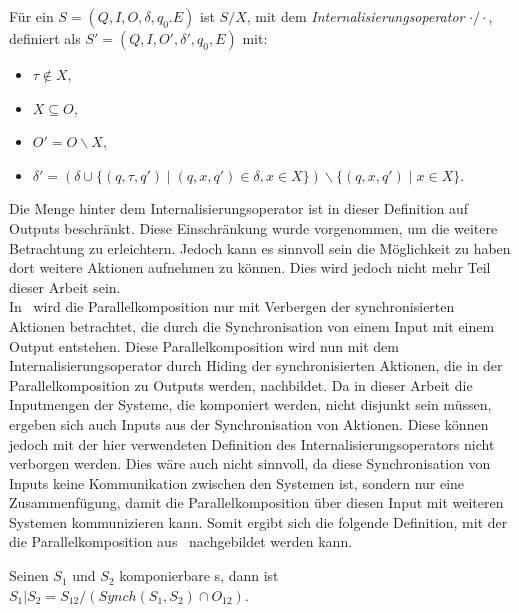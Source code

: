 \begin{Def}[Internalisierungsoperator]
  Für ein \EIO{} $S=(Q,I,O,\delta ,q_0.E)$ ist $S/X$, mit
  dem \emph{Internalisierungsoperator} $\cdot /\cdot$,
  definiert als $S'=(Q,I,O',\delta ', q_0,E)$ mit:
  \begin{itemize}
    \item $\tau \notin X$,
    \item $X\subseteq O$,
    \item $O'=O\backslash X$,
    \item $\delta '=(\delta\cup\{(q,\tau ,q')\mid (q,x,q')\in\delta
      ,x\in X\})\backslash \{(q,x,q')\mid x\in X\}$.
  \end{itemize}
\end{Def}

Die Menge hinter dem Internalisierungsoperator ist in dieser Definition auf
Outputs beschränkt. Diese Einschränkung wurde vorgenommen, um die weitere
Betrachtung zu erleichtern. Jedoch kann es sinnvoll sein die Möglichkeit zu
haben dort weitere Aktionen aufnehmen zu können. Dies wird jedoch nicht mehr
Teil dieser Arbeit sein.\\
In~\cite{Vogler2014EIO} wird die Parallelkomposition nur mit Verbergen der
synchronisierten Aktionen betrachtet, die durch die Synchronisation von einem
Input mit einem Output entstehen. Diese Parallelkomposition wird nun mit dem
Internalisierungsoperator durch Hiding der synchronisierten Aktionen, die in
der Parallelkomposition zu Outputs werden, nachbildet. Da in dieser Arbeit
die Inputmengen der Systeme, die komponiert werden, nicht disjunkt sein müssen,
ergeben sich auch Inputs aus der Synchronisation von Aktionen. Diese können
jedoch mit der hier verwendeten Definition des Internalisierungsoperators nicht verborgen
werden. Dies wäre auch nicht sinnvoll, da diese Synchronisation von Inputs
keine Kommunikation zwischen den Systemen ist, sondern nur eine Zusammenfügung,
damit die Parallelkomposition über diesen Input mit weiteren Systemen
kommunizieren kann. Somit ergibt sich die folgende Definition, mit der die
Parallelkomposition aus~\cite{Vogler2014EIO} nachgebildet werden kann.

\begin{Def}
\label{defIntParal}
  Seinen $S_1$ und $S_2$ komponierbare \EIO{}s, dann ist
  $S_1|S_2=S_{12}/(Synch(S_1,S_2)\cap O_{12})$.
\end{Def}
